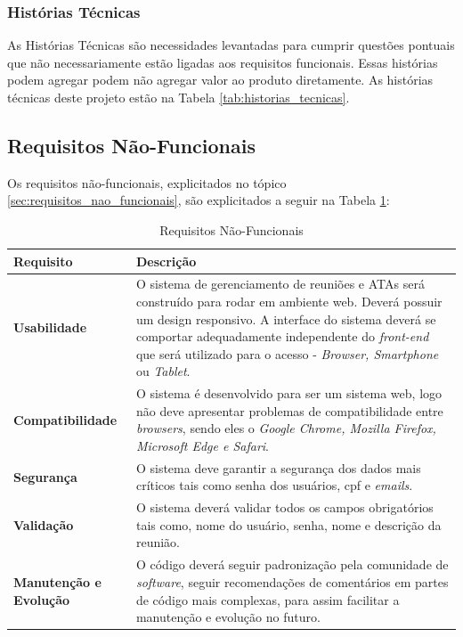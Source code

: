 \subsubsection{Histórias Técnicas}

As Histórias Técnicas são necessidades levantadas para cumprir questões pontuais que não necessariamente estão ligadas aos requisitos funcionais. Essas histórias podem agregar podem não agregar valor ao produto diretamente. As histórias técnicas deste projeto estão na Tabela \ref{tab:historias_tecnicas}. 

\subsection{Requisitos Não-Funcionais}

Os requisitos não-funcionais, explicitados no tópico \ref{sec:requisitos_nao_funcionais}, são explicitados a seguir na Tabela \ref{tab:requisitos_nao_funcionais}:

\begin{table}[H]
	\begin{tabular}{|p{5.0cm}|p{10.0cm}|} 
	\hline
	\textbf{Requisito} & \textbf{Descrição} \\ \hline
	\textbf{Usabilidade} & O sistema de gerenciamento de reuniões e ATAs será construído para rodar em ambiente web. Deverá possuir um design responsivo. A interface do sistema deverá se comportar adequadamente independente do \textit{front-end} que será utilizado para o acesso - \textit{Browser, Smartphone} ou \textit{Tablet}. \\ \hline
	\textbf{Compatibilidade} & O sistema é desenvolvido para ser um sistema web, logo não deve apresentar problemas de compatibilidade entre \textit{browsers}, sendo eles o \textit{Google Chrome, Mozilla Firefox, Microsoft Edge e Safari}. \\ \hline
	\textbf{Segurança} & O sistema deve garantir a segurança dos dados mais críticos tais como senha dos usuários, cpf e \textit{emails}. \\ \hline
	\textbf{Validação} & O sistema deverá validar todos os campos obrigatórios tais como, nome do usuário, senha, nome e descrição da reunião. \\ \hline
	\textbf{Manutenção e Evolução} & O código deverá seguir padronização pela comunidade de \textit{software}, seguir recomendações de comentários em partes de código mais complexas, para assim facilitar a manutenção e evolução no futuro. \\ \hline
	\end{tabular}
	 \caption{Requisitos Não-Funcionais}
	 \label{tab:requisitos_nao_funcionais}
\end{table}

